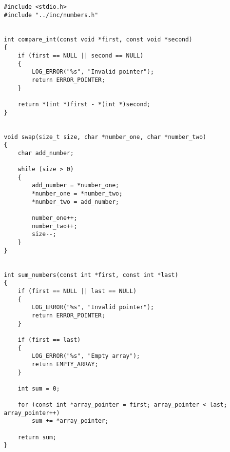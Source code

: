 \begin{center}
    \captionsetup{justification=raggedright,singlelinecheck=off}
    \begin{lstlisting}[label=lst:numbers,caption=numbers.c]
#include <stdio.h>
#include "../inc/numbers.h"


int compare_int(const void *first, const void *second)
{
    if (first == NULL || second == NULL)
    {
        LOG_ERROR("%s", "Invalid pointer");
        return ERROR_POINTER;
    }

    return *(int *)first - *(int *)second;
}


void swap(size_t size, char *number_one, char *number_two)
{
    char add_number;

    while (size > 0)
    {
        add_number = *number_one;
        *number_one = *number_two;
        *number_two = add_number;

        number_one++;
        number_two++;
        size--;
    }
}


int sum_numbers(const int *first, const int *last)
{
    if (first == NULL || last == NULL)
    {
        LOG_ERROR("%s", "Invalid pointer");
        return ERROR_POINTER;
    }

    if (first == last)
    {
        LOG_ERROR("%s", "Empty array");
        return EMPTY_ARRAY;
    }

    int sum = 0;

    for (const int *array_pointer = first; array_pointer < last; array_pointer++)
        sum += *array_pointer;

    return sum;
}
\end{lstlisting}
\end{center}

\clearpage

